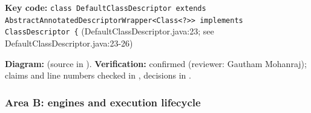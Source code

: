 \documentclass[11pt,a4paper]{article}
\begin{document}
\textbf{Key code:} \texttt{class Default\allowbreak{}Class\allowbreak{}Descriptor extends Abstract\allowbreak{}Annotated\allowbreak{}Descriptor\allowbreak{}Wrapper\textless{}Class\textless{}?\textgreater{}\textgreater{} implements Class\allowbreak{}Descriptor \{} (DefaultClassDescriptor.java:23; see DefaultClassDescriptor.java:23-26)\par
\textbf{Diagram:}  (source in ). \textbf{Verification:} confirmed (reviewer: Gautham Mohanraj); claims and line numbers checked in , decisions in .\par
\subsubsection*{Area B: engines and execution lifecycle}
\end{document}
